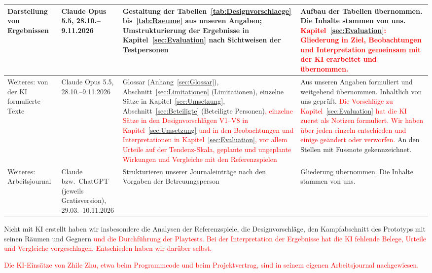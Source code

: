 \documentclass[../Main.tex]{subfiles}
\begin{document}
{\begin{longtable}{|>{\raggedright\arraybackslash}p{2.3cm}|>{\raggedright\arraybackslash}p{2.4cm}|>{\raggedright\arraybackslash}p{4.4cm}|>{\raggedright\arraybackslash}p{4.6cm}|}
        \hline
        Darstellung von Ergebnissen & Claude Opus 5.5, 28.10.--9.11.2026 & Gestaltung der Tabellen~\ref{tab:Designvorschlaege} bis~\ref{tab:Raeume} aus unseren Angaben; Umstrukturierung der Ergebnisse in Kapitel~\ref{sec:Evaluation} nach Sichtweisen der Testpersonen & Aufbau der Tabellen übernommen. Die Inhalte stammen von uns. \textcolor{red}{Kapitel~\ref{sec:Evaluation}: Gliederung in Ziel, Beobachtungen und Interpretation gemeinsam mit der KI erarbeitet und übernommen.} \\
        \hline
        Weiteres: von der KI formulierte Texte & Claude Opus 5.5, 28.10.--9.11.2026 & Glossar (Anhang~\ref{sec:Glossar}), Abschnitt~\ref{sec:Limitationen} (Limitationen), einzelne Sätze in Kapitel~\ref{sec:Umsetzung}, Abschnitt~\ref{sec:Beteiligte} (Beteiligte Personen)\textcolor{red}{, einzelne Sätze in den Designvorschlägen V1--V8 in Kapitel~\ref{sec:Umsetzung} und in den Beobachtungen und Interpretationen in Kapitel~\ref{sec:Evaluation}, vor allem Urteile auf der Tendenz-Skala, geplante und ungeplante Wirkungen und Vergleiche mit den Referenzspielen} & Aus unseren Angaben formuliert und weitgehend übernommen. Inhaltlich von uns geprüft. \textcolor{red}{Die Vorschläge zu Kapitel~\ref{sec:Evaluation} hat die KI zuerst als Notizen formuliert. Wir haben über jeden einzeln entschieden und einige geändert oder verworfen.} An den Stellen mit Fussnote gekennzeichnet. \\
        \hline
        Weiteres: Arbeitsjournal & Claude bzw.\ ChatGPT (jeweils Gratisversion), 29.03.--10.11.2026 & Strukturieren unserer Journaleinträge nach den Vorgaben der Betreuungsperson & Gliederung übernommen. Die Inhalte stammen von uns. \\
        \hline
    \end{longtable}
}

Nicht mit KI erstellt haben wir insbesondere die Analysen der Referenzspiele, die Designvorschläge, den Kampfabschnitt des Prototyps mit seinen Räumen und Gegnern\textcolor{red}{ und die Durchführung der Playtests. Bei der Interpretation der Ergebnisse hat die KI fehlende Belege, Urteile und Vergleiche vorgeschlagen. Entschieden haben wir darüber selbst.}

\textcolor{red}{Die KI-Einsätze von Zhile Zhu, etwa beim Programmcode und beim Projektvertrag, sind in seinem eigenen Arbeitsjournal nachgewiesen.}
\end{document}
